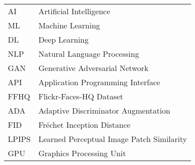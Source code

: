 \begin{tabular}{l l}
AI & Artificial Intelligence \\
ML & Machine Learning \\
DL & Deep Learning \\
NLP & Natural Language Processing \\
GAN & Generative Adversarial Network \\
API & Application Programming Interface \\
FFHQ & Flickr-Faces-HQ Dataset \\
ADA & Adaptive Discriminator Augmentation \\
FID & Fréchet Inception Distance \\
LPIPS & Learned Perceptual Image Patch Similarity \\
GPU & Graphics Processing Unit
\end{tabular}